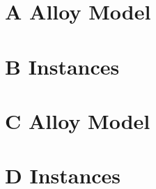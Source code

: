 \documentclass[12pt,a4paper,titlepage]{article}
\title{\doctitle}
\author{\docauthor}
\date{\d_mny\today}
\begin{document}
\begin{center}{\bfseries\Huge\doctitle}\end{center}
\section{A Alloy Model}


\section{B Instances}

\section {C Alloy Model}


\section{D Instances}
\end{document}
